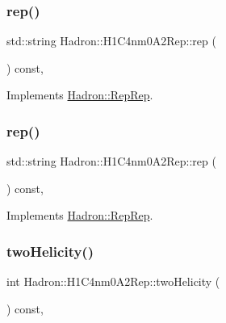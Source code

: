 \subsubsection{\texorpdfstring{rep()}{rep()}\hspace{0.1cm}{\footnotesize\ttfamily [4/5]}}
{\footnotesize\ttfamily std\+::string Hadron\+::\+H1\+C4nm0\+A2\+Rep\+::rep (\begin{DoxyParamCaption}{ }\end{DoxyParamCaption}) const\hspace{0.3cm}{\ttfamily [inline]}, {\ttfamily [virtual]}}



Implements \mbox{\hyperlink{structHadron_1_1RepRep_ab3213025f6de249f7095892109575fde}{Hadron\+::\+Rep\+Rep}}.

\mbox{\label{structHadron_1_1H1C4nm0A2Rep_aa814381161d711ca3fb036897c27ec86}} 
\subsubsection{\texorpdfstring{rep()}{rep()}\hspace{0.1cm}{\footnotesize\ttfamily [5/5]}}
{\footnotesize\ttfamily std\+::string Hadron\+::\+H1\+C4nm0\+A2\+Rep\+::rep (\begin{DoxyParamCaption}{ }\end{DoxyParamCaption}) const\hspace{0.3cm}{\ttfamily [inline]}, {\ttfamily [virtual]}}



Implements \mbox{\hyperlink{structHadron_1_1RepRep_ab3213025f6de249f7095892109575fde}{Hadron\+::\+Rep\+Rep}}.

\mbox{\label{structHadron_1_1H1C4nm0A2Rep_a0cd7ca19a38e71a97d7cbd87c8aa5617}} 
\subsubsection{\texorpdfstring{twoHelicity()}{twoHelicity()}\hspace{0.1cm}{\footnotesize\ttfamily [1/3]}}
{\footnotesize\ttfamily int Hadron\+::\+H1\+C4nm0\+A2\+Rep\+::two\+Helicity (\begin{DoxyParamCaption}{ }\end{DoxyParamCaption}) const\hspace{0.3cm}{\ttfamily [inline]}, {\ttfamily [virtual]}}

